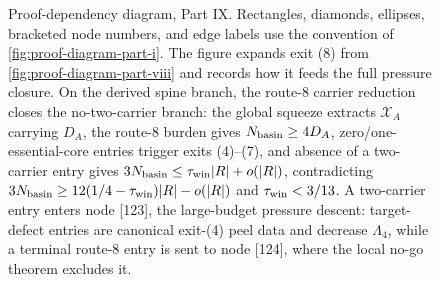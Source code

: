 \documentclass[11pt]{article}
\begin{document}
\begin{figure}[p]
{%
}
\caption[Proof-dependency diagram, Part IX]{Proof-dependency diagram, Part IX.  Rectangles, diamonds, ellipses, bracketed node numbers, and edge labels use the convention of \cref{fig:proof-diagram-part-i}.  The figure expands exit (8) from \cref{fig:proof-diagram-part-viii} and records how it feeds the full pressure closure.  On the derived spine branch, the route-8 carrier reduction closes the no-two-carrier branch: the global squeeze extracts $\mathcal X_A$ carrying $D_A$, the route-8 burden gives $N_{\rm basin}\ge4D_A$, zero/one-essential-core entries trigger exits (4)--(7), and absence of a two-carrier entry gives $3N_{\rm basin}\le\tau_{\rm win}|R|+o(|R|)$, contradicting $3N_{\rm basin}\ge12(1/4-\tau_{\rm win})|R|-o(|R|)$ and $\tau_{\rm win}<3/13$.  A two-carrier entry enters node [123], the large-budget pressure descent: target-defect entries are canonical exit-\textup{(4)} peel data and decrease \(\Lambda_4\), while a terminal route-8 entry is sent to node [124], where the local no-go theorem excludes it.}
\label{fig:proof-diagram-part-ix}
\end{figure}

\clearpage
\end{document}
